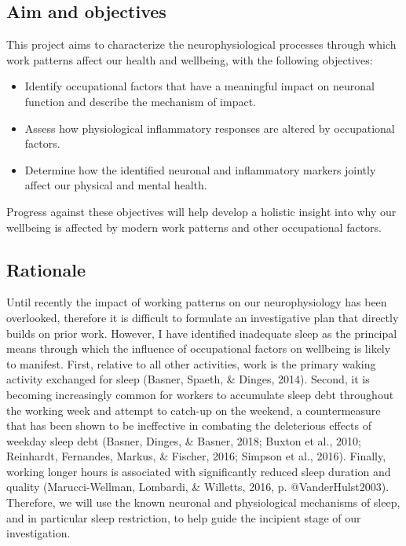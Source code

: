 \documentclass[
  english,
  man]{apa6}
\providecommand{\tightlist}{%
  \setlength{\itemsep}{0pt}\setlength{\parskip}{0pt}}
\begin{document}
\hypertarget{aim-and-objectives}{%
\subsection{Aim and objectives}\label{aim-and-objectives}}

This project aims to characterize the neurophysiological processes through which work patterns affect our health and wellbeing, with the following objectives:

\begin{itemize}
\tightlist
\item
  Identify occupational factors that have a meaningful impact on neuronal function and describe the mechanism of impact.
\item
  Assess how physiological inflammatory responses are altered by occupational factors.
\item
  Determine how the identified neuronal and inflammatory markers jointly affect our physical and mental health.
\end{itemize}

Progress against these objectives will help develop a holistic insight into why our wellbeing is affected by modern work patterns and other occupational factors.

\newpage

\hypertarget{rationale}{%
\subsection{Rationale}\label{rationale}}

Until recently the impact of working patterns on our neurophysiology has been overlooked, therefore it is difficult to formulate an investigative plan that directly builds on prior work. However, I have identified inadequate sleep as the principal means through which the influence of occupational factors on wellbeing is likely to manifest. First, relative to all other activities, work is the primary waking activity exchanged for sleep (Basner, Spaeth, \& Dinges, 2014). Second, it is becoming increasingly common for workers to accumulate sleep debt throughout the working week and attempt to catch-up on the weekend, a countermeasure that has been shown to be ineffective in combating the deleterious effects of weekday sleep debt (Basner, Dinges, \& Basner, 2018; Buxton et al., 2010; Reinhardt, Fernandes, Markus, \& Fischer, 2016; Simpson et al., 2016). Finally, working longer hours is associated with significantly reduced sleep duration and quality (Marucci-Wellman, Lombardi, \& Willetts, 2016, p. @VanderHulst2003). Therefore, we will use the known neuronal and physiological mechanisms of sleep, and in particular sleep restriction, to help guide the incipient stage of our investigation.
\end{document}
